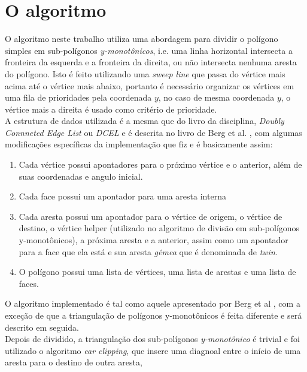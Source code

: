 \documentclass{article}
\begin{document}
\section{O algoritmo}
\hspace*{15pt}O algoritmo neste trabalho utiliza uma abordagem para dividir o polígono simples
em sub-polígonos \textit{y-monotônicos}, i.e. uma linha horizontal intersecta a
fronteira da esquerda e a fronteira da direita, ou não intersecta nenhuma aresta
do polígono. Isto é feito utilizando uma \textit{sweep line} que passa do vértice
mais acima até o vértice mais abaixo, portanto é necessário organizar os vértices
em uma fila de prioridades pela coordenada $y$, no caso de mesma coordenada $y$,
o vértice mais a direita é usado como critério de prioridade. \\
\hspace*{15pt}A estrutura de dados utilizada é a mesma que do livro da disciplina,
\textit{Doubly Connneted Edge List} ou \textit{DCEL} e é descrita no livro de
Berg et al. \cite{bergBook}, com algumas modificações específicas da implementação
que fiz e é basicamente assim:
\begin{enumerate}
    \item Cada vértice possui apontadores para o próximo vértice e o anterior,
    além de suas coordenadas e angulo inicial.
    \item Cada face possui um apontador para uma aresta interna
    \item Cada aresta possui um apontador para o vértice de origem, o vértice de
          destino, o vértice helper (utilizado no algoritmo de divisão em sub-polígonos
          y-monotônicos), a próxima aresta e a anterior, assim como um apontador para a
          face que ela está e sua aresta \textit{gêmea} que é denominada de \textit{twin}.
    \item O polígono possui uma lista de vértices, uma lista de arestas e uma lista de
          faces.
\end{enumerate}
\hspace*{15pt}O algoritmo implementado é tal como aquele apresentado
por Berg et al \cite{bergBook}, com a exceção de que a triangulação de polígonos
y-monotônicos é feita diferente e será descrito em seguida.\\
\hspace*{15pt}Depois de dividido, a triangulação dos sub-polígonos
\textit{y-monotônico} é trivial e foi utilizado o algoritmo \textit{ear clipping},
que insere uma diagnoal entre o início de uma aresta para o destino de outra aresta,
\end{document}
